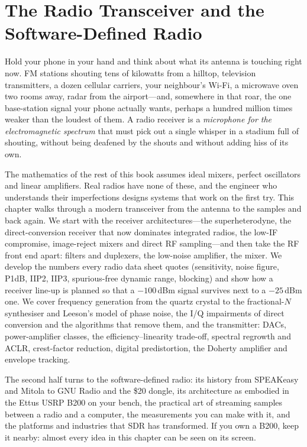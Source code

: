 \chapter{The Radio Transceiver and the Software-Defined Radio}
\label{ch:sdr}

\begin{chapterintro}
Hold your phone in your hand and think about what its antenna is touching right now. FM stations
shouting tens of kilowatts from a hilltop, television transmitters, a dozen cellular carriers, your
neighbour's Wi-Fi, a microwave oven two rooms away, radar from the airport---and, somewhere in that
roar, the one base-station signal your phone actually wants, perhaps a hundred million times weaker
than the loudest of them. A radio receiver is a \emph{microphone for the electromagnetic spectrum}
that must pick out a single whisper in a stadium full of shouting, without being deafened by the
shouts and without adding hiss of its own.

The mathematics of the rest of this book assumes ideal mixers, perfect oscillators and linear
amplifiers. Real radios have none of these, and the engineer who understands their imperfections
designs systems that work on the first try. This chapter walks through a modern transceiver from the
antenna to the samples and back again. We start with the receiver architectures---the
superheterodyne, the direct-conversion receiver that now dominates integrated radios, the low-IF
compromise, image-reject mixers and direct RF sampling---and then take the RF front end apart:
filters and duplexers, the low-noise amplifier, the mixer. We develop the numbers every radio data
sheet quotes (sensitivity, noise figure, P1dB, IIP2, IIP3, spurious-free dynamic range, blocking) and
show how a receiver line-up is planned so that a $-100$\,dBm signal survives next to a $-25$\,dBm one.
We cover frequency generation from the quartz crystal to the fractional-$N$ synthesiser and Leeson's
model of phase noise, the I/Q impairments of direct conversion and the algorithms that remove them,
and the transmitter: DACs, power-amplifier classes, the efficiency--linearity trade-off, spectral
regrowth and ACLR, crest-factor reduction, digital predistortion, the Doherty amplifier and envelope
tracking.

The second half turns to the software-defined radio: its history from SPEAKeasy and Mitola to GNU
Radio and the \$20 dongle, its architecture as embodied in the Ettus USRP B200 on your bench, the
practical art of streaming samples between a radio and a computer, the measurements you can make with
it, and the platforms and industries that SDR has transformed. If you own a B200, keep it nearby:
almost every idea in this chapter can be seen on its screen.
\end{chapterintro}

